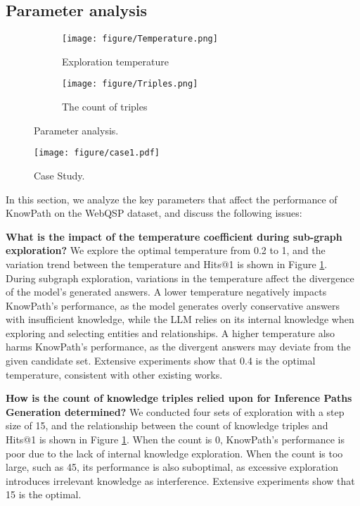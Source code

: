 \subsection{Parameter analysis}

\begin{figure}[t]
  \centering
  \begin{subfigure}{0.49\linewidth}
    \texttt{[image: figure/Temperature.png]}
    \caption{Exploration temperature}
      \label{fig:tempreture}
  \end{subfigure}
  \begin{subfigure}{0.49\linewidth}
    \texttt{[image: figure/Triples.png]}
    \caption{The count of triples}

    \label{fig:triple}
  \end{subfigure}
  \caption{Parameter analysis.}
  \label{fig:Parameter}
\end{figure}
\begin{figure*}[t]
  \centering
    \texttt{[image: figure/case1.pdf]}
  \caption{Case Study.}
  \label{fig:case}
\end{figure*}



In this section, we analyze the key parameters that affect the performance of KnowPath on the WebQSP dataset, and discuss the following issues:

\textbf{What is the impact of the temperature coefficient during sub-graph exploration?}
We explore the optimal temperature from 0.2 to 1, and the variation trend between the temperature and Hits@1 is shown in Figure \ref{fig:tempreture}.
During subgraph exploration, variations in the temperature affect the divergence of the model's generated answers. A lower temperature negatively impacts KnowPath's performance, as the model generates overly conservative answers with insufficient knowledge, while the LLM relies on its internal knowledge when exploring and selecting entities and relationships. A higher temperature also harms KnowPath's performance, as the divergent answers may deviate from the given candidate set.
Extensive experiments show that 0.4 is the optimal temperature, consistent with other existing works.


\textbf{How is the count of knowledge triples relied upon for Inference Paths Generation determined?}
We conducted four sets of exploration with a step size of 15, and the relationship between the count of knowledge triples and Hits@1 is shown in Figure \ref{fig:tempreture}.
When the count is 0, KnowPath's performance is poor due to the lack of internal knowledge exploration. When the count is too large, such as 45, its performance is also suboptimal, as excessive exploration introduces irrelevant knowledge as interference. Extensive experiments show that 15 is the optimal.

